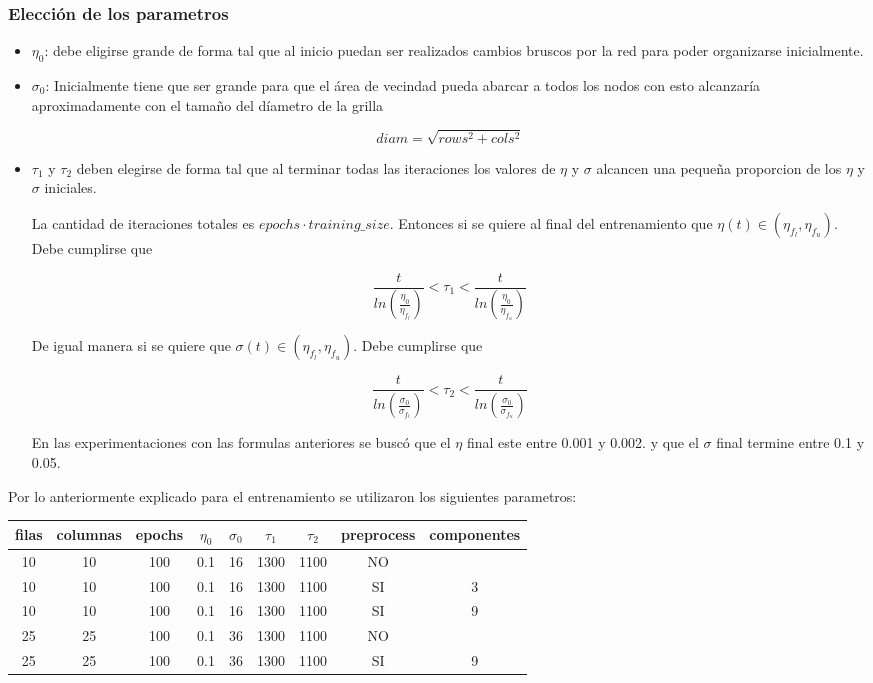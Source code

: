 \subsubsection{Elección de los parametros}
\begin{itemize}
	\item $\eta_0$: debe eligirse grande de forma tal que al inicio
puedan ser realizados cambios bruscos por la red para 
poder organizarse inicialmente.

	\item $\sigma_0$: Inicialmente tiene que ser grande para que el área
de vecindad pueda abarcar a todos los nodos con esto alcanzaría aproximadamente
con el tamaño del díametro de la grilla

\[
	diam = \sqrt{rows^2+cols^2}
\]
	\item $\tau_1$ y $\tau_2$ deben elegirse de forma tal que al terminar
	todas las iteraciones los valores de $\eta$ y $\sigma$ alcancen
	una pequeña proporcion de los $\eta$ y $\sigma$ iniciales.

	La cantidad de iteraciones totales es $epochs \cdot training\_size $.
	Entonces si se quiere al final del entrenamiento que $\eta(t) \in (\eta_{f_l}, \eta_{f_u})$.
	Debe cumplirse que

	\[ \frac{t}{ln(\frac{\eta_0}{\eta_{f_l}})} < \tau_{1} < \frac{t}{ln(\frac{\eta_0}{\eta_{f_u}})} \]

	De igual manera si se quiere que $\sigma(t) \in (\eta_{f_l}, \eta_{f_u})$. Debe cumplirse que

	\[ \frac{t}{ln(\frac{\sigma_0}{\sigma_{f_l}})} < \tau_{2} < \frac{t}{ln(\frac{\sigma_0}{\sigma_{f_u}})} \]

	En las experimentaciones con las formulas anteriores se buscó que el $\eta$ final este entre 0.001 y 0.002.
	y que el $\sigma$ final termine entre 0.1 y 0.05.

\end{itemize}

Por lo anteriormente explicado para el entrenamiento se utilizaron los siguientes parametros:
\begin{center}
  \begin{tabular}{|c|c|c|c|c|c|c|c|c|}
    \hline
    filas & columnas & epochs & $\eta_0$ & $\sigma_0$ & $\tau_1$ & $\tau_2$ & preprocess & componentes \\
    \hline
	10 & 10 & 100 & 0.1 & 16 & 1300 & 1100 & NO & \ \\
    \hline
	10 & 10 & 100 & 0.1 & 16 & 1300 & 1100 & SI & 3 \\
    \hline
	10 & 10 & 100 & 0.1 & 16 & 1300 & 1100 & SI & 9 \\
    \hline
	25 & 25 & 100 & 0.1 & 36 & 1300 & 1100 & NO & \  \\
    \hline
	25 & 25 & 100 & 0.1 & 36 & 1300 & 1100 & SI & 9  \\
    \hline
  \end{tabular}
\end{center}

